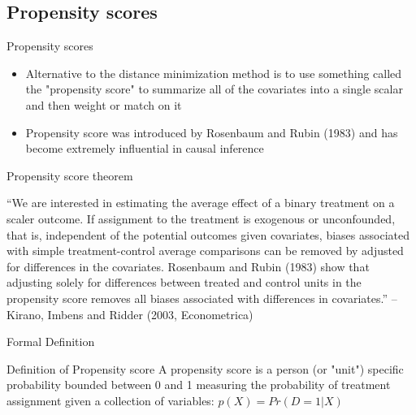 \documentclass{beamer}
\begin{document}
\subsection{Propensity scores}


\begin{frame}{Propensity scores}

\begin{itemize}
\item Alternative to the distance minimization method is to use something called the "propensity score" to summarize all of the covariates into a single scalar and then weight or match on it 
\item Propensity score was introduced by Rosenbaum and Rubin (1983) and has become extremely influential in causal inference
\end{itemize}



\end{frame}

\begin{frame}{Propensity score theorem}

\footnotesize
``We are interested in estimating the average effect of a binary treatment on a scaler outcome.  If assignment to the treatment is exogenous or unconfounded, that is, independent of the potential outcomes given covariates, biases associated with simple treatment-control average comparisons can be removed by adjusted for differences in the covariates.  Rosenbaum and Rubin (1983) show that adjusting solely for differences between treated and control units in the propensity score removes all biases associated with differences in covariates.'' -- Kirano, Imbens and Ridder (2003, Econometrica)

\end{frame}





\begin{frame}{Formal Definition}
	
	\begin{block}{Definition of Propensity score}
	A propensity score is a person (or "unit") specific probability bounded between 0 and 1 measuring the probability of treatment assignment given a collection of variables: $p(X)=Pr(D=1 | X)$
	\end{block}
	

\end{frame}
\end{document}
